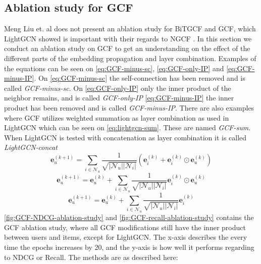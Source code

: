 \subsection{Ablation study for GCF}
Meng Liu et. al does not present an ablation study for BiTGCF and GCF, which LightGCN showed is important with their regards to NGCF \cite{lightgcn,BiTGCF}.
In this section we conduct an ablation study on GCF to get an understanding on the effect of the different parts of the embedding propagation and layer combination.
Examples of the equations can be seen on \autoref{eq:GCF-minus-sc}, \autoref{eq:GCF-only-IP} and \autoref{eq:GCF-minus-IP}.
On \autoref{eq:GCF-minus-sc} the self-connection has been removed and is called \textit{GCF-minus-sc}.
On \autoref{eq:GCF-only-IP} only the inner product of the neighbor remains, and is called \textit{GCF-only-IP}
\autoref{eq:GCF-minus-IP} the inner product has been removed and is called \textit{GCF-minus-IP}.
There are also examples where GCF utilizes weighted summation as layer combination as used in LightGCN which can be seen on \autoref{eq:lightgcn-sum}.
These are named \textit{GCF-sum}.
When LightGCN is tested with concatenation as layer combination it is called \textit{LightGCN-concat}
\begin{equation}
    \mathbf{e}_{u}^{(k+1)} = \sum^{}_{i \in \mathcal{N}_u}  \frac{1}{\sqrt{|\mathcal{N}_u||\mathcal{N}_i|}}\left( \mathbf{e}_i^{(k)} + \mathbf{e}_i^{(k)} \odot \mathbf{e}_u^{(k)} \right)
    \label{eq:GCF-minus-sc}
\end{equation}
\begin{equation}
    \mathbf{e}_{u}^{(k+1)} = \mathbf{e}_{u}^{(k)} + \sum^{}_{i \in \mathcal{N}_u}  \frac{1}{\sqrt{|\mathcal{N}_u||\mathcal{N}_i|}} \mathbf{e}_i^{(k)} \odot \mathbf{e}_u^{(k)}
    \label{eq:GCF-only-IP}
\end{equation}
\begin{equation}
    \mathbf{e}_{u}^{(k+1)} = \mathbf{e}_{u}^{(k)} + \sum^{}_{i \in \mathcal{N}_u}  \frac{1}{\sqrt{|\mathcal{N}_u||\mathcal{N}_i|}} \mathbf{e}_i^{(k)}
    \label{eq:GCF-minus-IP}
\end{equation}
\autoref{fig:GCF-NDCG-ablation-study} and \autoref{fig:GCF-recall-ablation-study} contains the GCF ablation study, where all GCF modifications still have the inner product between users and items, except for LightGCN.
The x-axis describes the every time the epochs increases by 20, and the y-axis is how well it performs regarding to NDCG or Recall.
The methods are as described here:\\
